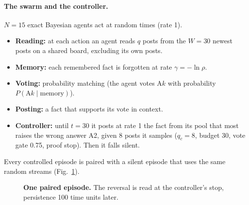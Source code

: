 \documentclass[10pt,a4paper]{article}
\begin{document}
\paragraph{The swarm and the controller.} $N=15$ exact Bayesian agents act at random times (rate 1).
\begin{itemize}
\item \textbf{Reading:} at each action an agent reads $q$ posts from the $W=30$ newest posts on a shared board,
  excluding its own posts.
\item \textbf{Memory:} each remembered fact is forgotten at rate $\gamma=-\ln\rho$.
\item \textbf{Voting:} probability matching (the agent votes A$k$ with probability $P(\mathrm{A}k\mid\text{memory})$).
\item \textbf{Posting:} a fact that supports its vote in context.
\item \textbf{Controller:} until $t=30$ it posts at rate 1 the fact from its pool that most raises the wrong answer
  A2, given 8 posts it samples ($q_c=8$, budget 30, vote gate 0.75, proof stop). Then it falls silent.
\end{itemize}
Every controlled episode is paired with a silent episode that uses the same random streams (Fig.~\ref{fig:timeline}).

\begin{figure}[h]
\centering
{}
\caption{\textbf{One paired episode.} The reversal is read at the controller's stop, persistence 100 time units later.}
\label{fig:timeline}
\end{figure}
\end{document}
